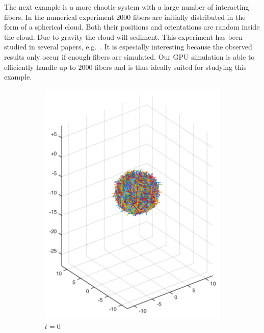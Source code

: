The next example is a more chaotic system with a large number of interacting fibers. In the numerical experiment $2000$ fibers are initially distributed in the form of a spherical cloud. Both their positions and orientations are random inside the cloud. Due to gravity the cloud will sediment. This experiment has been studied in several papers, e.g.~\cite{Bulow2015}\cite{Metzger2007}\cite{Park2010}. It is especially interesting because the observed results only occur if enough fibers are simulated. Our GPU simulation is able to efficiently handle up to $2000$ fibers and is thus ideally suited for studying this example.

\begin{figure}[!htbp]
  \centering
  \begin{subfigure}[h]{0.4\textwidth}
    \centering
    \includegraphics[width=\textwidth]{img/state_00000.pdf}
    \caption{$t=0$}\label{fig:sphere_simulation_1a}
  \end{subfigure}
  \begin{subfigure}[h]{0.4\textwidth}

\end{subfigure}
\end{figure}

